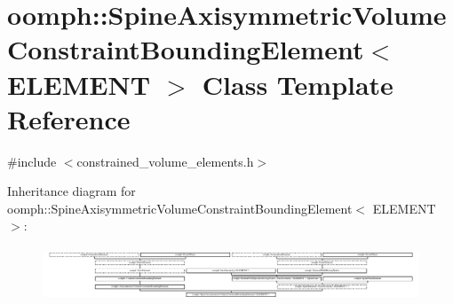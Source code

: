 \hypertarget{classoomph_1_1SpineAxisymmetricVolumeConstraintBoundingElement}{}\section{oomph\+:\+:Spine\+Axisymmetric\+Volume\+Constraint\+Bounding\+Element$<$ E\+L\+E\+M\+E\+NT $>$ Class Template Reference}
\label{classoomph_1_1SpineAxisymmetricVolumeConstraintBoundingElement}


{\ttfamily \#include $<$constrained\+\_\+volume\+\_\+elements.\+h$>$}

Inheritance diagram for oomph\+:\+:Spine\+Axisymmetric\+Volume\+Constraint\+Bounding\+Element$<$ E\+L\+E\+M\+E\+NT $>$\+:\begin{figure}[H]
\begin{center}
\leavevmode
\includegraphics[height=1.631068cm]{classoomph_1_1SpineAxisymmetricVolumeConstraintBoundingElement}
\end{center}
\end{figure}

